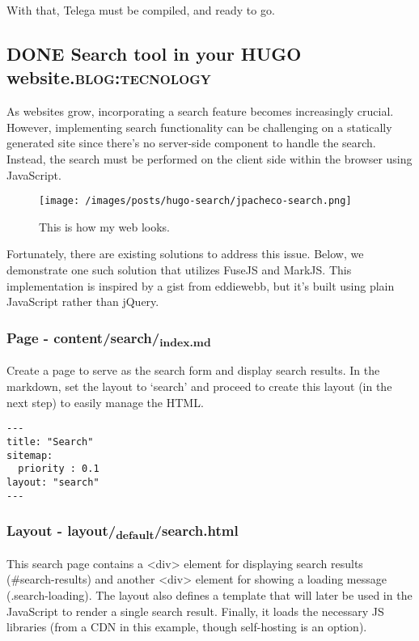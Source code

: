 \documentclass[11pt]{article}
\begin{document}
With that, Telega must be compiled, and ready to go.
\subsection{{\bfseries\sffamily DONE} Search tool in your HUGO website.\hfill{}\textsc{blog:tecnology}}
\label{sec:orgba330bc}
As websites grow, incorporating a search feature becomes increasingly crucial. However, implementing search functionality can be challenging on a statically generated site since there's no server-side component to handle the search. Instead, the search must be performed on the client side within the browser using JavaScript.

\begin{center}
\begin{figure}[htbp]
\centering
\texttt{[image: /images/posts/hugo-search/jpacheco-search.png]}
\caption{This is how my web looks.}
\end{figure}
\end{center}

Fortunately, there are existing solutions to address this issue. Below, we demonstrate one such solution that utilizes FuseJS and MarkJS. This implementation is inspired by a gist from eddiewebb, but it's built using plain JavaScript rather than jQuery.
\subsubsection{Page - content/search/\textsubscript{index.md}}
\label{sec:org0e2fdc5}
Create a page to serve as the search form and display search results. In the markdown, set the layout to ‘search’ and proceed to create this layout (in the next step) to easily manage the HTML.

\begin{verbatim}
---
title: "Search"
sitemap:
  priority : 0.1
layout: "search"
---
\end{verbatim}
\subsubsection{Layout - layout/\textsubscript{default}/search.html}
\label{sec:org698261e}
This search page contains a <div> element for displaying search results (\#search-results) and another <div> element for showing a loading message (.search-loading). The layout also defines a template that will later be used in the JavaScript to render a single search result. Finally, it loads the necessary JS libraries (from a CDN in this example, though self-hosting is an option).
\end{document}

